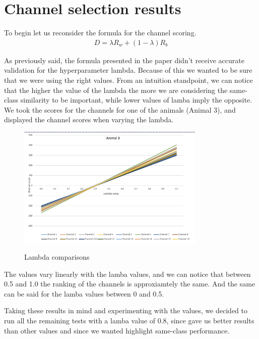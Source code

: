 \documentclass{Configuration_Files/PoliMi3i_thesis}
\begin{document}
\section{Channel selection results}

To begin let us reconsider the formula for the channel scoring.
\begin{align}
	D = \lambda R_w + (1-\lambda)R_b
   \label{eq:XCDC6_3}
\end{align}

As previously said, the formula presented in the paper \cite{yuCrossCorrelationBasedDiscriminant2021}
didn't receive accurate validation for the hyperparameter lambda.
Because of this we wanted to be sure that we were using the right values.
From an intuition standpoint, we can notice that the higher the value of the lambda the more we are considering the same-class similarity to be important, while lower values of lamba imply the opposite.
We took the scores for the channels for one of the animals (Animal 3), and displayed the channel scores when varying the lambda.

\begin{figure}[H]
    \centering
    \includegraphics[width=0.8\textwidth]{Results Matteo/figure1}
    \label{figure1}
    \caption{Lambda comparisons}
\end{figure}

The values vary linearly with the lamba values, and we can notice that between 0.5 and 1.0 the ranking of the channels is approxiamtely the same.
And the same can be said for the lamba values between 0 and 0.5.

Taking these results in mind and experimenting with the values, we decided to run all the remaining tests with a lamba value of 0.8, since gave us better results than other values and since we wanted highlight same-class performance.
\end{document}
